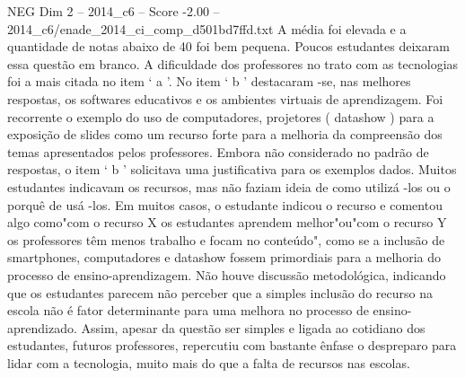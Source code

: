 \begin{textsample}{NEG Dim 2 – 2014\_c6 – Score -2.00 – 2014\_c6/enade\_2014\_ci\_comp\_d501bd7ffd.txt}
A média foi elevada e a quantidade de notas abaixo de 40 foi bem pequena.
Poucos estudantes deixaram essa questão em branco.
A dificuldade dos professores no trato com as tecnologias foi a mais citada no item ‘ a ’.
No item ‘ b ’ destacaram -se, nas melhores respostas, os softwares educativos e os ambientes virtuais de aprendizagem.
Foi recorrente o exemplo do uso de computadores, projetores ( datashow ) para a exposição de slides como um recurso forte para a melhoria da compreensão dos temas apresentados pelos professores.
Embora não considerado no padrão de respostas, o item ‘ b ’ solicitava uma justificativa para os exemplos dados.
Muitos estudantes indicavam os recursos, mas não faziam ideia de como utilizá -los ou o porquê de usá -los.
Em muitos casos, o estudante indicou o recurso e comentou algo como"com o recurso X os estudantes aprendem melhor"ou"com o recurso Y os professores têm menos trabalho e focam no conteúdo", como se a inclusão de smartphones, computadores e datashow fossem primordiais para a melhoria do processo de ensino-aprendizagem.
Não houve discussão metodológica, indicando que os estudantes parecem não perceber que a simples inclusão do recurso na escola não é fator determinante para uma melhora no processo de ensino-aprendizado.
Assim, apesar da questão ser simples e ligada ao cotidiano dos estudantes, futuros professores, repercutiu com bastante ênfase o despreparo para lidar com a tecnologia, muito mais do que a falta de recursos nas escolas.

\end{textsample}
